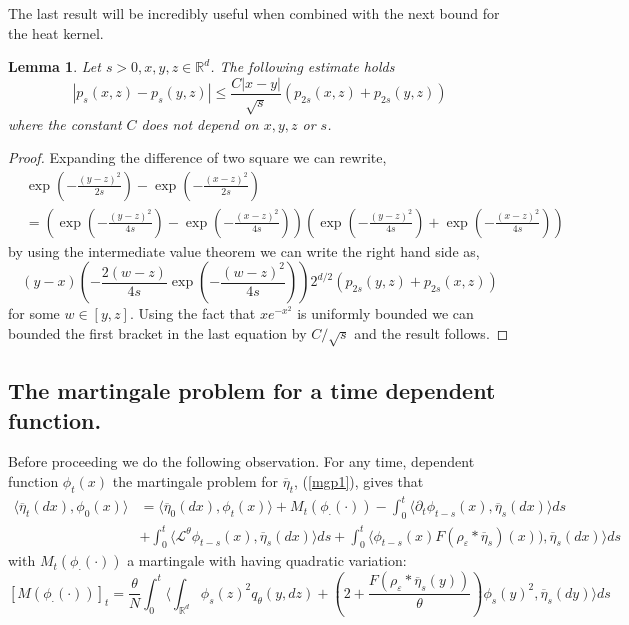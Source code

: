 \documentclass[a4paper,12pt]{article}
\newtheorem{lemma}[theorem]{Lemma}
\newcommand{\1}{{\bf {1}}}
\def\epsilon{\varepsilon}
\begin{document}
The last result will be incredibly useful when combined with the next bound for the heat kernel.
\begin{lemma}
Let $s>0, x, y, z\in \mathbb{R}^d$. The following estimate holds
\[ |p_s(x,z) - p_s(y,z)| \leq \frac{C|x-y|}{\sqrt{s}} \left(p_{2s}(x,z) + p_{2s}(y,z)\right) \]
where the constant $C$ does not depend on $x,y,z$ or $s$.\label{Lemma:ContinuityHS}
\end{lemma}
\begin{proof}
Expanding the difference of two square we can rewrite,
\begin{align*}
&\exp\left(-\frac{(y-z)^2}{2 s} \right)-\exp\left(-\frac{(x-z)^2}{2 s} \right) \\ &= \left(\exp\left(-\frac{(y-z)^2}{4 s} \right)-\exp\left(-\frac{(x-z)^2}{4 s} \right) \right)\left(\exp\left(-\frac{(y-z)^2}{4 s} \right)+\exp\left(-\frac{(x-z)^2}{4 s} \right) \right)
\end{align*}
by using the intermediate value theorem we can write the right hand side as,
\[ (y-x) \left( - \frac{2(w-z)}{4s} \exp\left(-\frac{(w-z)^2}{4s}\right)\right) 2^{d/2}\left( p_{2s}(y,z)+p_{2s}(x,z) \right)\]
for some $w \in [y,z]$. Using the fact that $x e^{-x^2}$ is uniformly bounded we can bounded the first bracket in the last equation by $C/\sqrt{s}$ and the result follows.
\end{proof}

\subsection{The martingale problem for a time dependent function.}
Before proceeding we do the following observation. For any time, dependent function $\phi_t(x)$ the martingale problem for $\overline{\eta}_t$, (\ref{mgp1}), gives that
\begin{align}
\langle \overline{\eta}_t(dx), \phi_0(x)\rangle &= \langle \overline{\eta}_0(dx), \phi_t(x)\rangle +  M_t(\phi_\cdot(\cdot)) - \int_0^t \langle \partial_t \phi_{t-s}(x), \overline{\eta}_s(dx) \rangle  ds \nonumber \\ & + \int_0^t \langle \mathcal{L}^\theta \phi_{t-s}(x), \overline{\eta}_s(dx) \rangle ds+ \int_{0}^t \langle \phi_{t-s}(x)F (\rho_\epsilon*\overline{\eta}_s)(x) ) , \overline{\eta}_s(dx) \rangle ds \label{timeMGP}
\end{align}
with $M_t(\phi_\cdot(\cdot))$ a martingale with having quadratic variation:
\[ [M(\phi_\cdot(\cdot))]_t = \frac{\theta}{N}\int_0^t \langle \int_{\mathbb{R}^d} \phi_s(z)^2 q_\theta(y,dz) + \left( 2 + \frac{F(\rho_\epsilon*\overline{\eta}_s(y))}{\theta}\right) \phi_s(y)^2, \overline{\eta}_s(dy) \rangle ds \]
\end{document}
